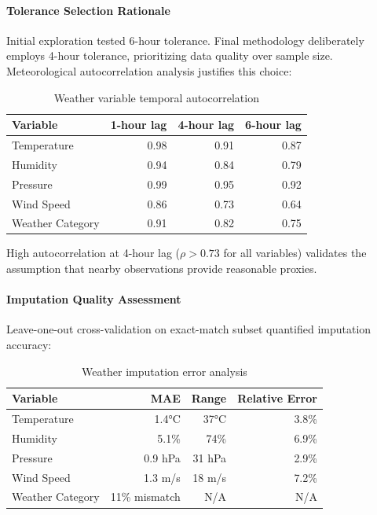 \documentclass{report}
\begin{document}
\paragraph{Tolerance Selection Rationale}

Initial exploration tested 6-hour tolerance. Final methodology deliberately employs 4-hour tolerance, prioritizing data quality over sample size. Meteorological autocorrelation analysis justifies this choice:

\begin{table}[h]
\centering
\caption{Weather variable temporal autocorrelation}
\label{tab:weather_autocorr}
\begin{tabular}{lrrr}
\toprule
\textbf{Variable} & \textbf{1-hour lag} & \textbf{4-hour lag} & \textbf{6-hour lag} \\
\midrule
Temperature & 0.98 & 0.91 & 0.87 \\
Humidity & 0.94 & 0.84 & 0.79 \\
Pressure & 0.99 & 0.95 & 0.92 \\
Wind Speed & 0.86 & 0.73 & 0.64 \\
Weather Category & 0.91 & 0.82 & 0.75 \\
\bottomrule
\end{tabular}
\end{table}

High autocorrelation at 4-hour lag ($\rho > 0.73$ for all variables) validates the assumption that nearby observations provide reasonable proxies.

\paragraph{Imputation Quality Assessment}

Leave-one-out cross-validation on exact-match subset quantified imputation accuracy:

\begin{table}[h]
\centering
\caption{Weather imputation error analysis}
\label{tab:imputation_error}
\begin{tabular}{lrrr}
\toprule
\textbf{Variable} & \textbf{MAE} & \textbf{Range} & \textbf{Relative Error} \\
\midrule
Temperature & 1.4°C & 37°C & 3.8\% \\
Humidity & 5.1\% & 74\% & 6.9\% \\
Pressure & 0.9 hPa & 31 hPa & 2.9\% \\
Wind Speed & 1.3 m/s & 18 m/s & 7.2\% \\
Weather Category & 11\% mismatch & N/A & N/A \\
\bottomrule
\end{tabular}
\end{table}
\end{document}
